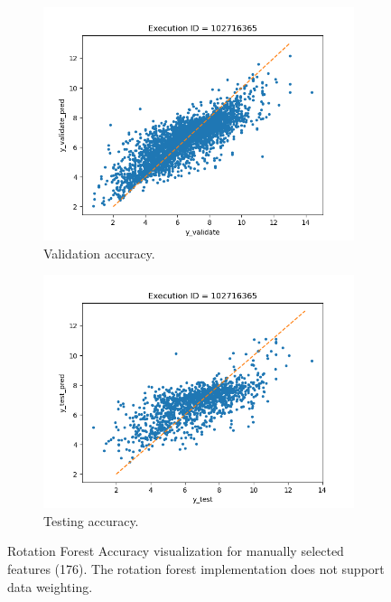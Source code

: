 \documentclass[11pt]{article}
\begin{document}
\begin{figure}
     \centering
     \begin{subfigure}[b]{0.45\textwidth}
         \centering
         \includegraphics[scale=0.45]{images/accuracyRotationFRvalidate}
         \caption{Validation accuracy.}
        \label{fig:accuracyRotationFRvalidate}
     \end{subfigure}
     \hfill
     \begin{subfigure}[b]{0.45\textwidth}
         \centering
         \includegraphics[scale=0.45]{images/accuracyRotationFRtest}
        \caption{Testing accuracy.}
        \label{fig:accuracyRotationFRtest}
     \end{subfigure}
     \caption{Rotation Forest Accuracy visualization for manually selected features (176).  The rotation forest implementation does not support data weighting.}
     \label{fig:RotationForestAccuracy}
\end{figure}
\end{document}
